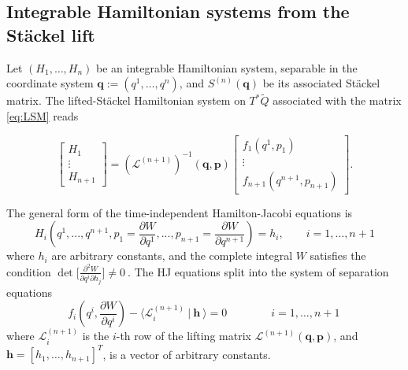 \documentclass[10pt]{amsart}
\numberwithin{equation}{section}
\newcommand{\bs}{\boldsymbol}
\theoremstyle{definition}
\begin{document}
	\subsection{Integrable Hamiltonian systems from the St\"ackel lift}
	Let $(H_1,\ldots,H_n)$ be an integrable Hamiltonian system, separable in the coordinate system $\bs{q}:=(q^1,\ldots,q^n)$, and $S^{(n)}(\bs{q})$ be its associated St\"ackel matrix.
	The lifted-St\"ackel Hamiltonian system on $T^{*}\tilde{Q}$ associated with the matrix \eqref{eq:LSM} reads
	
	
	\begin{equation} \label{eq:LSH}
		\begin{bmatrix}
			H_1 \\
			\vdots \\
			H_{n+1}
		\end{bmatrix}
		=
		(\mathcal{L}^{(n+1)})^{-1}(\bs{q}, \bs{p})
		\begin{bmatrix}
			f_1 (q^1,p_1)\\
			\vdots \\
			f_{n+1}(q^{n+1},p_{n+1})
		\end{bmatrix}.
	\end{equation}
	
	 The general form of the time-independent Hamilton-Jacobi equations is
\begin{equation*}
H_i \left( q^{1}, ..., q^{n+1}, p_{1} = \dfrac{\partial W}{\partial q^{1}}, ..., p_{n+1} = \dfrac{\partial W}{\partial q^{n+1}} \right) = h_i, \qquad i=1,\ldots,n+1
\end{equation*}
where $h_i$ are arbitrary constants, and the complete integral $W$ satisfies the condition 
$
\det \bigg[ \frac{\partial^2 W}{\partial q^i\partial h_j} \bigg]\neq 0 \ 
$. The HJ equations  split into the system of separation equations
	\begin{equation} \label{eq:5.10}
		f_i\left(q^i, \frac{\partial W} {\partial q^i}\right)-\langle \mathcal{L}^{(n+1)}_i~|~\bs{h}~\rangle=0 \qquad \qquad i=1,\ldots,n+1 \,
	\end{equation}
	where $\mathcal{L}^{(n+1)}_i$ is the $i$-th row of the lifting matrix $\mathcal{L}^{(n+1)}(\bs{q},\bs{p})$, and $\bs{h}=[h_1,\ldots,h_{n+1}]^{T}$, is a vector of arbitrary constants.
	
	
	
\end{document}
